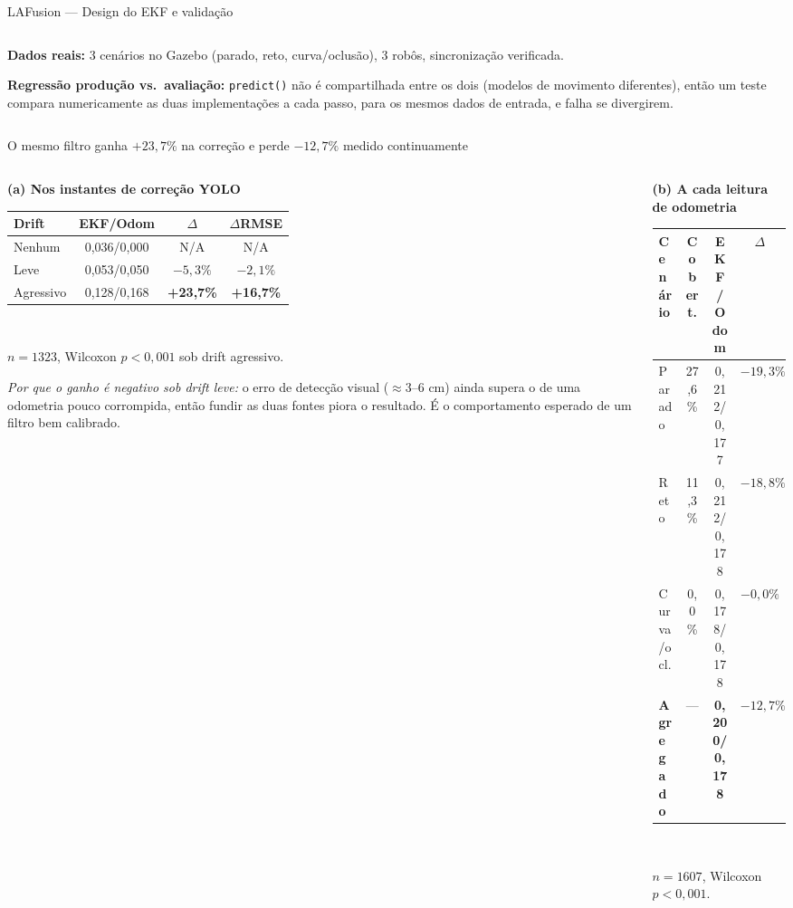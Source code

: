 \documentclass[aspectratio=169]{beamer}
\begin{document}
\begin{frame}{LAFusion — Design do EKF e validação}
\begin{columns}[T]
\begin{column}{0.46\textwidth}
\vspace{0.1cm}
\textbf{Dados reais:} 3 cenários no Gazebo (parado, reto, curva/oclusão), 3 robôs, sincronização verificada.

\vspace{0.1cm}
\textbf{Regressão produção vs.\ avaliação:} \texttt{predict()} não é compartilhada entre os dois (modelos de movimento diferentes), então um teste compara numericamente as duas implementações a cada passo, para os mesmos dados de entrada, e falha se divergirem.
\end{column}
\end{columns}
\end{frame}

\begin{frame}{O mesmo filtro ganha $+23{,}7\%$ na correção e perde $-12{,}7\%$ medido continuamente}
\begin{columns}[T]
\begin{column}{0.5\textwidth}
\centering\scriptsize
\textbf{(a) Nos instantes de correção YOLO}\\[2pt]
\begin{tabular}{lccc}
\toprule
\textbf{Drift} & \textbf{EKF/Odom} & \textbf{$\Delta$} & \textbf{$\Delta$RMSE} \\
\midrule
Nenhum & 0,036/0,000 & N/A & N/A \\
Leve & 0,053/0,050 & $-5,3\%$ & $-2,1\%$ \\
Agressivo & 0,128/0,168 & \textbf{+23,7\%} & \textbf{+16,7\%} \\
\bottomrule
\end{tabular}\\[2pt]
\raggedright $n=1323$, Wilcoxon $p<0{,}001$ sob drift agressivo.

\vspace{0.1cm}
\emph{Por que o ganho é negativo sob drift leve:} o erro de detecção visual ($\approx$3–6 cm) ainda supera o de uma odometria pouco corrompida, então fundir as duas fontes piora o resultado. É o comportamento esperado de um filtro bem calibrado.
\end{column}
\begin{column}{0.5\textwidth}
\centering\scriptsize
\textbf{(b) A cada leitura de odometria}\\[2pt]
\begin{tabular}{lccc}
\toprule
\textbf{Cenário} & \textbf{Cobert.} & \textbf{EKF/Odom} & \textbf{$\Delta$} \\
\midrule
Parado & 27,6\% & 0,212/0,177 & $-19,3\%$ \\
Reto & 11,3\% & 0,212/0,178 & $-18,8\%$ \\
Curva/ocl. & 0,0\% & 0,178/0,178 & $-0,0\%$ \\
\textbf{Agregado} & --- & \textbf{0,200/0,178} & \textbf{$-12,7\%$} \\
\bottomrule
\end{tabular}\\[2pt]
\raggedright $n=1607$, Wilcoxon $p<0{,}001$.


\end{column}
\end{columns}
\end{frame}
\end{document}
